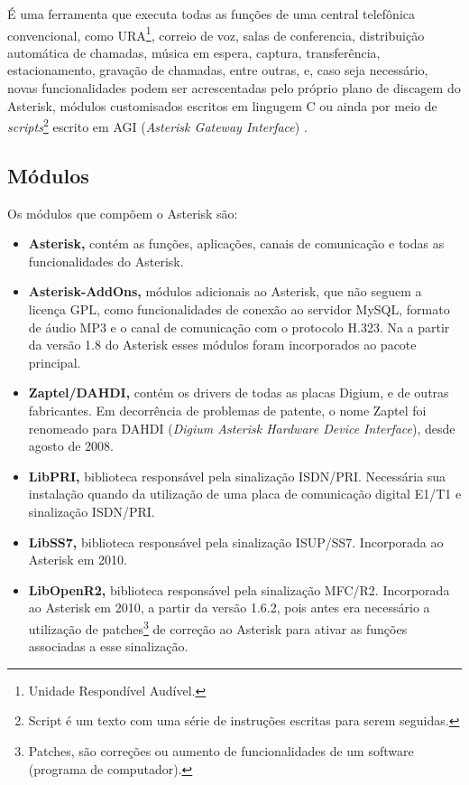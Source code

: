 É uma ferramenta que executa todas as funções de uma central telefônica convencional, como URA\footnote{Unidade Respondível Audível.}, correio de voz, salas de conferencia, distribuição automática de chamadas, música em espera, captura, transferência, estacionamento, gravação de chamadas, entre outras, e, caso seja necessário, novas funcionalidades podem ser acrescentadas pelo próprio plano de discagem do Asterisk, módulos customisados escritos em lingugem C ou ainda por meio de \textit{scripts}\footnote{Script é um texto com uma série de instruções escritas para serem seguidas.} escrito em AGI (\textit{Asterisk Gateway Interface}) \cite{alexandrekeller2014}.

\subsection{Módulos}
Os módulos que compõem o Asterisk são: \cite{books/daglib/0018909}

\begin{itemize}
  \item \textbf{Asterisk,} contém as funções, aplicações, canais de comunicação e todas as funcionalidades do Asterisk.
  \item \textbf{Asterisk-AddOns,} módulos adicionais ao Asterisk, que não seguem a licença GPL, como funcionalidades de conexão ao servidor MySQL, formato de áudio MP3 e o canal de comunicação com o protocolo H.323. Na a partir da versão 1.8 do Asterisk esses módulos foram incorporados ao pacote principal.
  \item \textbf{Zaptel/DAHDI,} contém os drivers de todas as placas Digium, e de outras fabricantes. Em decorrência de problemas de patente, o nome Zaptel foi renomeado para DAHDI (\textit{Digium Asterisk Hardware Device Interface}), desde agosto de 2008.
  \item \textbf{LibPRI,} biblioteca responsável pela sinalização ISDN/PRI. Necessária sua instalação quando da utilização de uma placa de comunicação digital E1/T1 e sinalização ISDN/PRI.
  \item \textbf{LibSS7,} biblioteca responsável pela sinalização ISUP/SS7. Incorporada ao Asterisk em 2010.
  \item \textbf{LibOpenR2,} biblioteca responsável pela sinalização MFC/R2. Incorporada ao Asterisk em 2010, a partir da versão 1.6.2, pois antes era necessário a utilização de patches\footnote{Patches, são correções ou aumento de funcionalidades de um software (programa de computador).} de correção ao Asterisk para ativar as funções associadas a esse sinalização.
\end{itemize}

